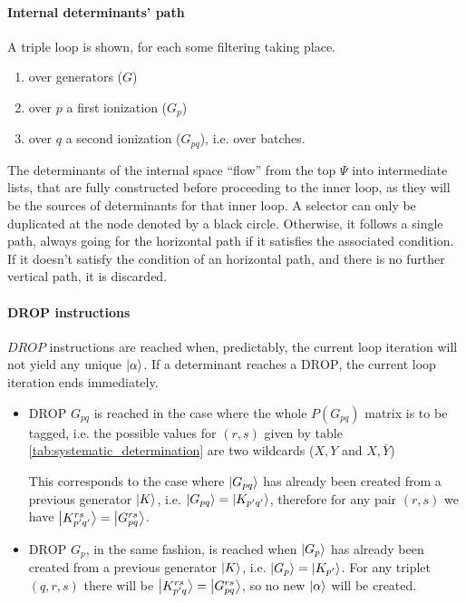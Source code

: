 \documentclass[./thesis.tex]{subfiles}
\begin{document}
\paragraph{Internal determinants' path}
 
A triple loop is shown, for each some filtering taking place.

\begin{enumerate}
\item
over generators ($G$)
\item
over $p$ a first ionization ($G_p$)
\item
over $q$ a second ionization ($G_{pq}$), i.e. over batches.
\end{enumerate}

The determinants of the internal space ``flow'' from the top $\Psi$ into intermediate lists, that are fully constructed before proceeding to the inner loop, as they will be the sources of determinants for that inner loop.
A selector can only be duplicated at the node denoted by a black circle. Otherwise, it follows a single path, always going for the horizontal path if it satisfies the associated condition.
If it doesn't satisfy the condition of an horizontal path, and there is no further vertical path, it is discarded.

\paragraph{DROP instructions}
$DROP$ instructions are reached when, predictably, the current loop iteration will not yield any unique ${\ket{\alpha}}$. If a determinant reaches a $\text{DROP}$, the current loop iteration ends immediately.

\begin{itemize}
\item
$\text{DROP } G_{pq}$ is reached in the case where the whole $P(G_{pq})$ matrix is to be tagged, i.e. the possible values for $(r,s)$ given by table \ref{tab:systematic_determination} are two wildcards ($X,Y$ and $X,\bar Y$)

This corresponds to the case where $\ket {G_{pq}}$ has already been created from a previous generator $\ket K$, i.e. $\ket {G_{pq}} = \ket {K_{p'q'}}$, therefore for any pair $(r,s)$ we have $\ket {K_{p'q'}^{rs}} = \ket {G_{pq}^{rs}}$.\\
\item
$\text{DROP } G_{p}$, in the same fashion, is reached when $\ket {G_{p}}$ has already been created from a previous generator $\ket K$, i.e. $\ket {G_{p}} = \ket{K_{p'}}$. For any triplet $(q,r,s)$ there will be $\ket {K_{p'q}^{rs}} = \ket {G_{pq}^{rs}}$, so no new ${\ket{\alpha}}$ will be created.
\end{itemize}
\end{document}
